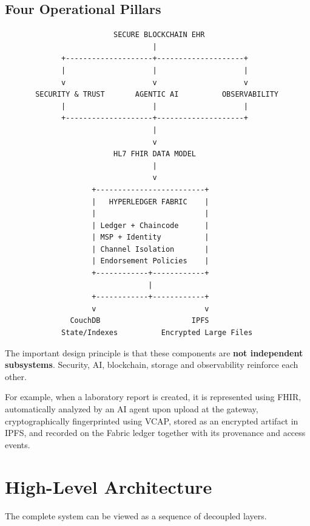 \documentclass[11pt,a4paper]{article}
\begin{document}
\subsection{Four Operational Pillars}
\begin{lstlisting}
                         SECURE BLOCKCHAIN EHR
                                  |
             +--------------------+--------------------+
             |                    |                    |
             v                    v                    v
       SECURITY & TRUST       AGENTIC AI          OBSERVABILITY
             |                    |                    |
             +--------------------+--------------------+
                                  |
                                  v
                         HL7 FHIR DATA MODEL
                                  |
                                  v
                    +-------------------------+
                    |   HYPERLEDGER FABRIC    |
                    |                         |
                    | Ledger + Chaincode      |
                    | MSP + Identity          |
                    | Channel Isolation       |
                    | Endorsement Policies    |
                    +------------+------------+
                                 |
                    +------------+------------+
                    v                         v
               CouchDB                     IPFS
             State/Indexes          Encrypted Large Files
\end{lstlisting}

The important design principle is that these components are \textbf{not independent subsystems}. Security, AI, blockchain, storage and observability reinforce each other.

For example, when a laboratory report is created, it is represented using FHIR, automatically analyzed by an AI agent upon upload at the gateway, cryptographically fingerprinted using VCAP, stored as an encrypted artifact in IPFS, and recorded on the Fabric ledger together with its provenance and access events.

\newpage
\section{High-Level Architecture}

The complete system can be viewed as a sequence of decoupled layers.
\end{document}
